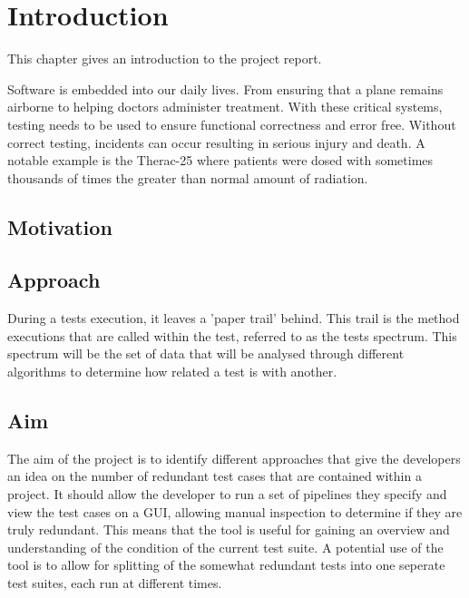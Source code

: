\chapter{Introduction}\label{C:intro}
This chapter gives an introduction to the project report.

Software is embedded into our daily lives. From ensuring that a plane remains airborne to helping doctors administer treatment. With these critical systems, testing needs to be used to ensure functional correctness and error free. Without correct testing, incidents can occur resulting in serious injury and death. A notable example is the Therac-25 where patients were dosed with sometimes thousands of times the greater than normal amount of radiation. 

\section{Motivation}

\section{Approach}

During a tests execution, it leaves a 'paper trail' behind. This trail is the method executions that are called within the test, referred to as the tests spectrum.  This spectrum will be the set of data that will be analysed through different algorithms to determine how related a test is with another. 

\section{Aim}

The aim of the project is to identify different approaches that give the developers an idea on the number of redundant test cases that are contained within a project. It should allow the developer to run a set of pipelines they specify and view the test cases on a GUI, allowing manual inspection to determine if they are truly redundant. This means that the tool is useful for gaining an overview and understanding of the condition of the current test suite. A potential use of the tool is to allow for splitting of the somewhat redundant tests into one seperate test suites, each run at different times.
